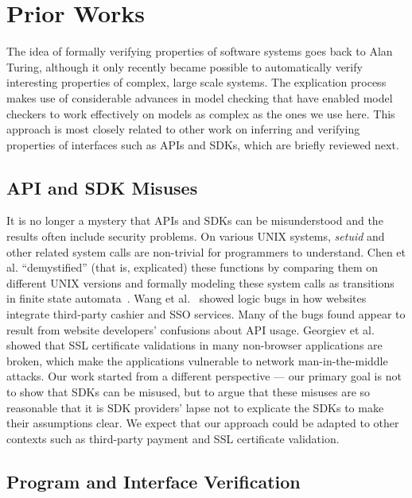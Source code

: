 \section{Prior Works}
\label{sec:explicatingPriorWorks}

The idea of formally verifying properties of software systems goes back to Alan Turing, although it only recently became possible to automatically verify interesting properties of complex, large scale systems.  The explication process makes use of considerable advances in model checking that have enabled model checkers to work effectively on models as complex as the ones we use here.  This approach is most closely related to other work on inferring and verifying properties of interfaces such as APIs and SDKs, which are briefly reviewed next.

\subsection{API and SDK Misuses}

It is no longer a mystery that APIs and SDKs can be misunderstood and the results often include security problems.  On various UNIX systems, \emph{setuid} and other related system calls are non-trivial for programmers to understand.  Chen et al. ``demystified'' (that is, explicated) these functions by comparing them on different UNIX versions and formally modeling these system calls as transitions in finite state automata~\cite{Chen:2002:SD:647253.720278}.  Wang et al.~\cite{Wang:2011:SFO:2006077.2006782,Wang:2012:SMY:2310656.2310691} showed logic bugs in how websites integrate third-party cashier and SSO services.  Many of the bugs found appear to result from website developers' confusions about API usage. Georgiev et al.~\cite{Georgiev:2012:MDC:2382196.2382204} showed that SSL certificate validations in many non-browser applications are broken, which make the applications vulnerable to network man-in-the-middle attacks.  Our work started from a different perspective --- our primary goal is not to show that SDKs can be misused, but to argue that these misuses are so reasonable that it is SDK providers' lapse not to explicate the SDKs to make their assumptions clear.  We expect that our approach could be adapted to other contexts such as third-party payment and SSL certificate validation. 

\subsection{Program and Interface Verification}

